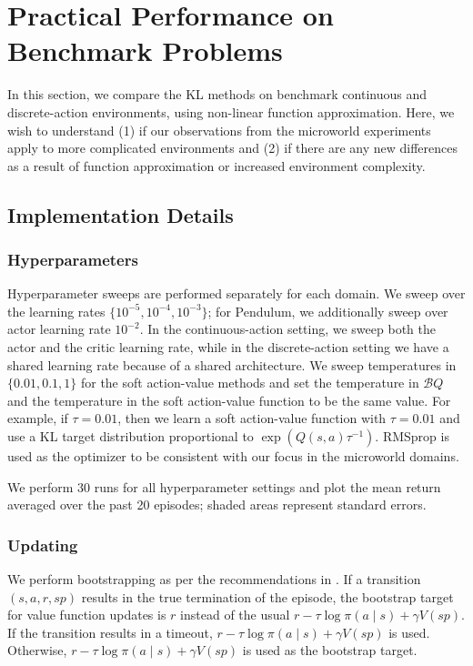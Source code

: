 \documentclass[twoside,11pt]{article}
\newcommand{\boltzmannQ}{\mathcal{B}Q}
\begin{document}
\section{Practical Performance on Benchmark Problems}

In this section, we compare the KL methods on benchmark continuous and discrete-action environments, using non-linear function approximation. Here, we wish to understand (1) if our observations from the microworld experiments apply to more complicated environments and (2) if there are any new differences as a result of function approximation or increased environment complexity. 

\subsection{Implementation Details}
\subsubsection{Hyperparameters}
Hyperparameter sweeps are performed separately for each domain. We sweep over the learning rates $\{10^{-5}, 10^{-4}, 10^{-3}\}$; for Pendulum, we additionally sweep over actor learning rate $10^{-2}$. In the continuous-action setting, we sweep both the actor and the critic learning rate, while in the discrete-action setting we have a shared learning rate because of a shared architecture. We sweep temperatures in $\{0.01, 0.1, 1\}$ for the soft action-value methods and set the temperature in $\boltzmannQ$ and the temperature in the soft action-value function to be the same value. For example, if $\tau = 0.01$, then we learn a soft action-value function with $\tau = 0.01$ and use a KL target distribution proportional to $\exp(Q(s, a) \tau^{-1})$. RMSprop \citep{tieleman2012lecture} is used as the optimizer to be consistent with our focus in the microworld domains. 

We perform 30 runs for all hyperparameter settings and plot the mean return averaged over the past 20 episodes; shaded areas represent standard errors. 


\subsubsection{Updating}
We perform bootstrapping as per the recommendations in \citet{pardo2017time}. If a transition $(s, a, r, sp)$ results in the true termination of the episode, the bootstrap target for value function updates is $r$ instead of the usual $r - \tau \log \pi(a \mid s) + \gamma V(sp)$. If the transition results in a timeout, $r - \tau \log \pi(a \mid s) + \gamma V(sp)$ is used. Otherwise, $r - \tau \log \pi(a \mid s) + \gamma V(sp)$ is used as the bootstrap target. 
\end{document}
